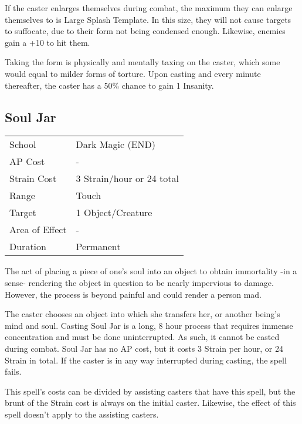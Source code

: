 \documentclass[11pt,a4paper,twocolumn]{book}
\begin{document}
If the caster enlarges themselves during combat, the maximum they can enlarge themselves to is Large Splash Template. In this size, they will not cause targets to suffocate, due to their form not being condensed enough. Likewise, enemies gain a +10 to hit them.

Taking the form is physically and mentally taxing on the caster, which some would equal to milder forms of torture. Upon casting and every minute thereafter, the caster has a 50\% chance to gain 1 Insanity.


\subsection*{Soul Jar}
{
	\begin{tabu} to 75mm{| X[l,4] | X[l,7] |}
		\hline
		School 			& Dark Magic (END) 		\\
		AP Cost	      	& - 					\\
		Strain Cost     & 3 Strain/hour or 24 total 					\\
		Range     		& Touch					\\
		Target      	& 1 Object/Creature		\\
		Area of Effect  & -  	 				\\
		Duration     	& Permanent				\\ \hline
	\end{tabu}
	
}

\medskip

The act of placing a piece of one's soul into an object to obtain immortality -in a sense- rendering the object in question to be nearly impervious to damage. However, the process is beyond painful and could render a person mad.

The caster chooses an object into which she transfers her, or another being's mind and soul. Casting Soul Jar is a long, 8 hour process that requires immense concentration and must be done uninterrupted. As such, it cannot be casted during combat. Soul Jar has no AP cost, but it costs 3 Strain per hour, or 24 Strain in total. If the caster is in any way interrupted during casting, the spell fails. 

This spell's costs can be divided by assisting casters that have this spell, but the brunt of the Strain cost is always on the initial caster. Likewise, the effect of this spell doesn't apply to the assisting casters.
\end{document}
